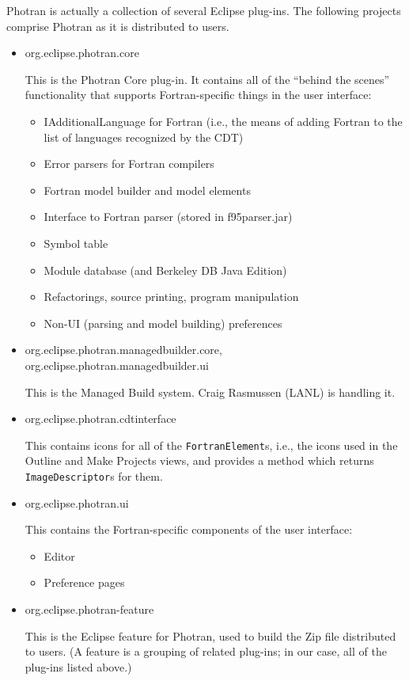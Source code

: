 
Photran is actually a collection of several Eclipse plug-ins.
The following projects comprise Photran as it is distributed to users.

\begin{itemize}
\item{org.eclipse.photran.core

	This is the Photran Core plug-in.  It
	contains all of the ``behind the scenes'' functionality that
	supports Fortran-specific things in the user interface:
\begin{itemize}
	\item{IAdditionalLanguage for Fortran (i.e., the means
              of adding Fortran to the list of languages recognized
              by the CDT)}
	\item{Error parsers for Fortran compilers}
	\item{Fortran model builder and model elements}
	\item{Interface to Fortran parser (stored in f95parser.jar)}
	\item{Symbol table}
	\item{Module database (and Berkeley DB Java Edition)}
	\item{Refactorings, source printing, program manipulation}
	\item{Non-UI (parsing and model building) preferences}
\end{itemize}}

\item{org.eclipse.photran.managedbuilder.core, org.eclipse.photran.managedbuilder.ui

	This is the Managed Build system.
	Craig Rasmussen (LANL) is handling it.}

\item{org.eclipse.photran.cdtinterface

	This contains icons for all of the \texttt{FortranElement}s, i.e.,
	the icons used in the Outline and Make Projects views, and
	provides a method which returns \texttt{ImageDescriptor}s for them.}

\item{org.eclipse.photran.ui

	This contains the Fortran-specific components of the user interface:
\begin{itemize}
	\item{Editor}
	\item{Preference pages}
\end{itemize}}

\item{org.eclipse.photran-feature

	This is the Eclipse feature for Photran, used to build the Zip
	file distributed to users.  (A feature is a grouping of related
	plug-ins; in our case, all of the plug-ins listed above.)}

\end{itemize}

